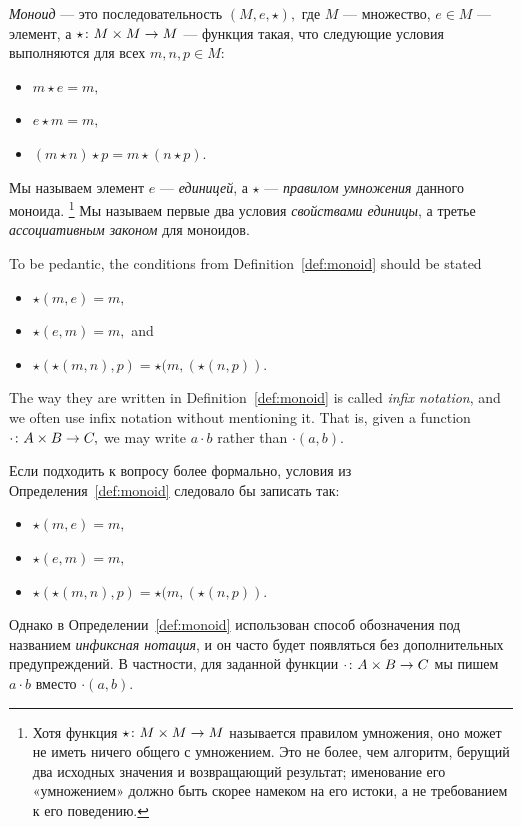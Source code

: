 \documentclass[CT4S-EN-RU]{subfiles}
\begin{document}
\begin{definitionRUS}[Моноид]\label{def:monoid}
{\em Моноид} — это последовательность $(M,e,\star),$ где $M$ — множество, $e\in M$ — элемент, а $\star\colon M\times M\rightarrow M$ — функция такая, что следующие условия выполняются для всех $m,n,p\in M$:
\begin{itemize}
\item $m\star e=m,$
\item $e\star m=m,$
\item $(m\star n)\star p=m\star(n\star p).$
\end{itemize}
Мы называем элемент $e$ — {\em единицей}, а $\star$ — {\em правилом умножения} данного моноида.%
\footnote{Хотя функция $\star\colon M\times M\rightarrow M$ называется правилом умножения, оно может не иметь ничего общего с умножением. Это не более, чем алгоритм, берущий два исходных значения и возвращающий результат; именование его «умножением» должно быть скорее намеком на его истоки, а не требованием к его поведению.}
Мы называем первые два условия {\em свойствами единицы}, а третье {\em ассоциативным законом} для моноидов.
\end{definitionRUS}

\begin{remarkENG}
To be pedantic, the conditions from Definition~\ref{def:monoid} should be stated
\begin{itemize}
\item $\star(m,e)=m,$
\item $\star(e,m)=m,$ and
\item $\star(\star(m,n),p)=\star(m,(\star(n,p)).$
\end{itemize}
The way they are written in Definition~\ref{def:monoid} is called {\em infix notation}, and we often use infix notation without mentioning it. That is, given a function $\cdot\colon A\times B\rightarrow C,$ we may write $a\cdot b$ rather than $\cdot(a,b).$
\end{remarkENG}

\begin{remarkRUS}
Если подходить к вопросу более формально, условия из Определения~\ref{def:monoid} следовало бы записать так:
\begin{itemize}
\item $\star(m,e)=m,$
\item $\star(e,m)=m,$
\item $\star(\star(m,n),p)=\star(m,(\star(n,p)).$
\end{itemize}
Однако в Определении~\ref{def:monoid} использован способ обозначения под названием {\em инфиксная нотация}, и он часто будет появляться без дополнительных предупреждений. В частности, для заданной функции $\cdot\colon A\times B\rightarrow C$ мы пишем $a\cdot b$ вместо $\cdot(a,b).$
\end{remarkRUS}
\end{document}
